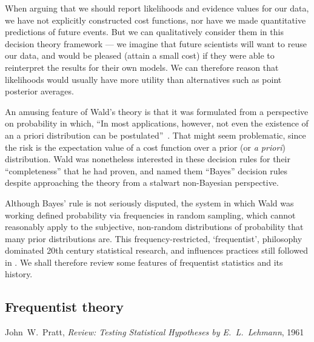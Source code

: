 When arguing that we should report likelihoods and evidence values for our
data, we have not explicitly constructed cost functions, nor have we made
quantitative predictions of future events.
But we can qualitatively consider them in this decision theory framework ---
we imagine that future scientists will want to reuse our data, and would be
pleased (attain a small cost) if they were able to reinterpret the results for
their own models.
We can therefore reason that likelihoods would usually have more utility than
alternatives such as point posterior averages.

An amusing feature of Wald's theory is that it was formulated from a
perspective on probability in which,
``In most applications, however, not even the existence of an a priori
distribution can be postulated''~\cite{wald1950bayes}.
That might seem problematic, since the risk is the expectation value of a cost
function over a prior (or \emph{a priori}) distribution.
Wald was nonetheless interested in these decision rules for their
``completeness'' that he had proven, and named them ``Bayes'' decision rules
despite approaching the theory from a stalwart non-Bayesian perspective.

Although Bayes' rule is not seriously disputed, the system in which Wald was
working defined probability via frequencies in random sampling, which cannot
reasonably apply to the subjective, non-random distributions of probability
that many prior distributions are.
This frequency-restricted, `frequentist', philosophy dominated 20th century
statistical research, and influences practices still followed in \atlas.
We shall therefore review some features of frequentist statistics and its
history.

\begin{singlespacing}
\section{Frequentist theory}
\label{sec:searches_frequentist}
\begin{epigraphs}
%
{John~W.~Pratt,
\textit{Review: Testing Statistical Hypotheses
by E.~L.~Lehmann},
1961~\cite{pratt1961testing}}
\end{epigraphs}
\end{singlespacing}

